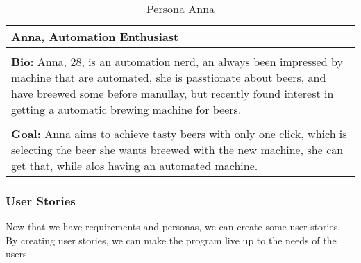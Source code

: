 \begin{table}[htb]
    \begin{center}
        \begin{tabular}{|p{16cm}|}
        \hline
        \textbf{Anna, Automation Enthusiast} \\
        \hline
        \\ \textbf{Bio:} Anna, 28, is an automation nerd, an always been impressed by machine that are automated, she is passtionate about beers, and have breewed some before manullay, but recently found interest in getting a automatic brewing machine for beers.  \\
        \\
        \textbf{Goal:} Anna aims to achieve tasty beers with only one click, which is selecting the beer she wants breewed with the new machine, she can get that, while alos having an automated machine. \\
        \hline
        \end{tabular}
        \caption{Persona Anna}
        \label{tab:persona_anna}
    \end{center}
\end{table}

\subsubsection{User Stories}

Now that we have requirements and personas, we can create some user stories. By creating user stories, we can make the program live up to the needs of the users.

